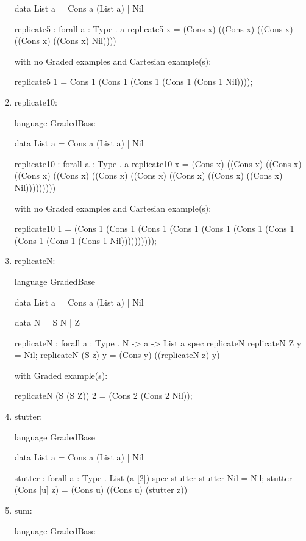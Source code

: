 \begin{enumerate}
\begin{granule}
data List a =  Cons a (List a) | Nil 

replicate5 : forall { a : Type } . a %
replicate5 x = (Cons x) ((Cons x) ((Cons x) ((Cons x) ((Cons x) Nil))))
\end{granule}
with no Graded examples and Cartesian example(s):
\begin{granule}
replicate5 1 = Cons 1 (Cons 1 (Cons 1 (Cons 1 (Cons 1 Nil))));
\end{granule}
\item replicate10: 
\begin{granule}
language GradedBase

data List a =  Cons a (List a) | Nil 

replicate10 : forall { a : Type } . a %
replicate10 x = (Cons x) ((Cons x) ((Cons x) ((Cons x) ((Cons x) ((Cons x) ((Cons x) ((Cons x) ((Cons x) ((Cons x) Nil)))))))))
\end{granule}
with no Graded examples and Cartesian example(s);
\begin{granule}
replicate10 1 = (Cons 1 (Cons 1 (Cons 1 (Cons 1 (Cons 1 (Cons 1 (Cons 1 (Cons 1 (Cons 1 (Cons 1 Nil))))))))));
\end{granule}
\item replicateN: 
\begin{granule}
language GradedBase

data List a =  Cons a (List a) | Nil 

data N = S N | Z
    
replicateN : forall { a : Type }
           . N %
           -> a %
           -> List a
spec
    replicateN %
replicateN Z y = Nil;
replicateN (S z) y = (Cons y) ((replicateN z) y)
\end{granule}
with Graded example(s):
\begin{granule}
replicateN (S (S Z)) 2 = (Cons 2 (Cons 2 Nil));
\end{granule}
\item stutter:
\begin{granule}
language GradedBase

data List a = Cons a (List a) | Nil

stutter : forall { a : Type } . List (a [2]) %
spec
    stutter %
stutter Nil = Nil;
stutter (Cons [u] z) = (Cons u) ((Cons u) (stutter z))
\end{granule}
\item sum:
\begin{granule}
language GradedBase 


\end{granule}
\end{enumerate}
